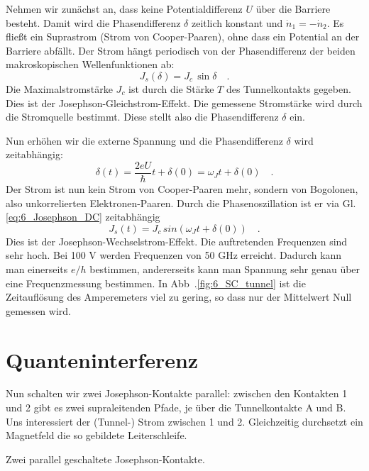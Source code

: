Nehmen wir zunächst an, dass keine Potentialdifferenz $U$ über die Barriere besteht. Damit wird die Phasendifferenz $\delta$ zeitlich konstant und $ \dot{n}_1 = - \dot{n}_2$. Es fließt ein Suprastrom (Strom von Cooper-Paaren), ohne dass ein Potential an der Barriere abfällt. Der Strom hängt periodisch von der Phasendifferenz der beiden makroskopischen Wellenfunktionen ab:
\begin{equation}
    J_s(\delta) = J_c \, \sin \delta \quad . \label{eq:6_Josephson_DC}
\end{equation}
Die Maximalstromstärke $J_c$ ist durch die  Stärke $T$ des Tunnelkontakts gegeben. Dies ist der Josephson-Gleichstrom-Effekt. Die gemessene Stromstärke wird durch die Stromquelle bestimmt. Diese stellt also die Phasendifferenz $\delta$ ein.



Nun erhöhen wir die externe Spannung und die Phasendifferenz $\delta$ wird zeitabhängig:
\begin{equation}
    \delta(t) = \frac{2eU}{\hbar} t + \delta(0)  = \omega_J t +  \delta(0)  \quad .
\end{equation}
Der Strom ist nun kein Strom von Cooper-Paaren mehr, sondern von Bogolonen, also unkorrelierten Elektronen-Paaren. Durch die Phasenoszillation ist er via Gl. \ref{eq:6_Josephson_DC} zeitabhängig
\begin{equation}
    J_s(t) = J_c \, sin  ( \omega_J t +  \delta(0) ) \quad .
\end{equation}
Dies ist der Josephson-Wechselstrom-Effekt. Die auftretenden Frequenzen sind sehr hoch. Bei 100 \textmu V werden Frequenzen von 50 GHz erreicht. Dadurch kann man einerseits $e/h$ bestimmen, andererseits kann man Spannung sehr genau über eine Frequenzmessung bestimmen. In Abb~.\ref{fig:6_SC_tunnel} ist die Zeitauflösung des Amperemeters viel zu gering, so dass nur der Mittelwert Null gemessen wird.


\section*{Quanteninterferenz}


Nun schalten wir zwei Josephson-Kontakte parallel: zwischen den Kontakten 1 und 2 gibt es zwei supraleitenden Pfade, je über die Tunnelkontakte A und B. Uns interessiert der (Tunnel-) Strom zwischen 1 und 2. Gleichzeitig durchsetzt ein Magnetfeld die so gebildete Leiterschleife.

\begin{marginfigure}
    \caption{Zwei parallel geschaltete Josephson-Kontakte.}
\end{marginfigure}


